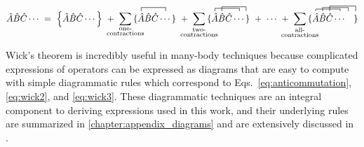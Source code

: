 \documentclass[thesis.tex]{subfiles}
\begin{document}
\begin{equation} \label{eq:wick4}
  \hat{A}\hat{B}\hat{C}\cdots\ =\ \normord{\hat{A}\hat{B}\hat{C}\cdots}\
  +\ \sum_{\mathclap{\substack{\text{one-} \\ \text{contractions}}}}
  \contraction[1.0ex]{\{ }{\hat{A}}{\hat{B}\hat{C}}{\cdots}
  \{ \hat{A}\hat{B}\hat{C}\cdots \}\
  +\ \sum_{\mathclap{\substack{\text{two-} \\ \text{contractions}}}}
  \contraction[0.8ex]{\{ }{\hat{A}}{\hat{B}\hat{C}}{\cdots}
  \contraction[1.2ex]{\{ \hat{A}}{\hat{B}}{\hat{C}\cdots}{}
  \{ \hat{A}\hat{B}\hat{C}\cdots \}\
  +\ \cdots\ +\ \sum_{\mathclap{\substack{\text{all-} \\ \text{contractions}}}}
  \contraction[0.6ex]{\{ }{\hat{A}}{\hat{B}\hat{C}}{\cdots}
  \contraction[1.0ex]{\{ \hat{A}}{\hat{B}}{\hat{C}\cdots}{\ }
  \contraction[1.4ex]{\{ \hat{A}\hat{B}}{\hat{C}}{\cdots\ \ \ }{}
  \{ \hat{A}\hat{B}\hat{C}\cdots\ \ \ \}
\end{equation}

Wick's theorem is incredibly useful in many-body techniques because complicated expressions of operators can be expressed as diagrams that are easy to compute with simple diagrammatic rules which correspond to Eqs.\ \eqref{eq:anticommutation},\eqref{eq:wick2}, and \eqref{eq:wick3}.  These diagrammatic techniques are an integral component to deriving expressions used in this work, and their underlying rules are summarized in \ref{chapter:appendix_diagrams} and are extensively discussed in \cite{SHAVITT2009}.
\end{document}
